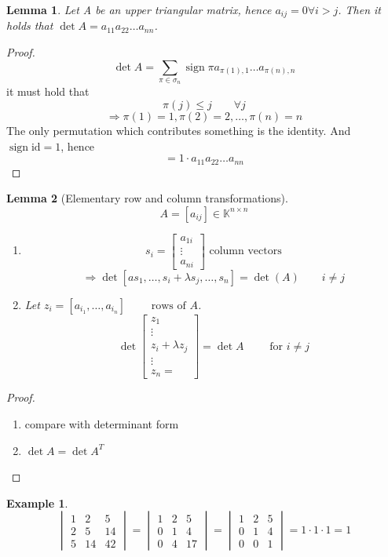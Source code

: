 \documentclass[a4paper,landscape,twocolumn]{article}
\newtheorem{ex}{Example}
\newtheorem{lemma}{Lemma}
\DeclareMathOperator\sign{sign}
\begin{document}
\begin{lemma}
  Let A be an upper triangular matrix, hence $a_{ij} = 0 \forall i > j$.
  Then it holds that $\det{A} = a_{11} a_{22} \ldots a_{nn}$.
\end{lemma}
\begin{proof}
  \[ \det{A} = \sum_{\pi \in \sigma_n} \sign{\pi} a_{\pi(1),1} \ldots a_{\pi(n),n} \]
  it must hold that
  \[ \pi(j) \leq j \qquad \forall j \]
  \[ \Rightarrow \pi(1) = 1, \pi(2) = 2, \ldots, \pi(n) = n \]
  The only permutation which contributes something is the identity.
  And $\sign{\text{id}} = 1$, hence
  \[ = 1 \cdot a_{11} a_{22} \ldots a_{nn} \]
\end{proof}

\begin{lemma}[Elementary row and column transformations]
  \label{lemma-7.33}
  \[ A = [a_{ij}] \in \mathbb K^{n \times n} \]
  \begin{enumerate}
    \item
      \[ s_i = \begin{bmatrix} a_{1i} \\ \vdots \\ a_{ni }\end{bmatrix} \text{ column vectors} \]
      \[ \Rightarrow \det[as_1, \ldots, s_i + \lambda s_j, \ldots, s_n] = \det(A) \qquad i \neq j \]
    \item
      Let $z_i = [a_{i_1}, \ldots, a_{i_n}] \qquad \text{ rows of $A$}$.
      \[ \det\begin{bmatrix} z_1 \\ \vdots \\ z_i + \lambda z_j \\ \vdots \\ z_n = \end{bmatrix} = \det{A} \qquad \text{ for } i \neq j \]
  \end{enumerate}
\end{lemma}
\begin{proof}
  \begin{enumerate}
    \item compare with determinant form
    \item $\det{A} = \det{A^T}$
  \end{enumerate}
\end{proof}

\begin{ex}
  \label{example-7.34}
  \[
    \begin{vmatrix}
      1 & 2 & 5 \\
      2 & 5 & 14 \\
      5 & 14 & 42
    \end{vmatrix}
    =
    \begin{vmatrix}
      1 & 2 & 5 \\
      0 & 1 & 4 \\
      0 & 4 & 17
    \end{vmatrix}
    =
    \begin{vmatrix}
      1 & 2 & 5 \\
      0 & 1 & 4 \\
      0 & 0 & 1
    \end{vmatrix}
    = 1 \cdot 1 \cdot 1
    = 1
  \]
\end{ex}
\end{document}
